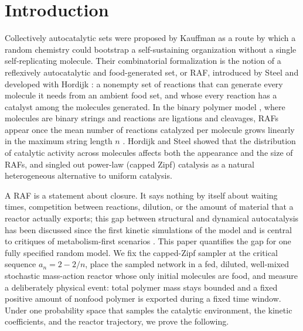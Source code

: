 \documentclass[11pt,letterpaper]{article}
\theoremstyle{plain}
\theoremstyle{definition}
\theoremstyle{remark}
\numberwithin{equation}{section}
\begin{document}
\section{Introduction}\label{sec:intro}

Collectively autocatalytic sets were proposed by Kauffman \cite{kauffman1986autocatalytic} as a route by which a random chemistry could bootstrap a self-sustaining organization without a single self-replicating molecule. Their combinatorial formalization is the notion of a reflexively autocatalytic and food-generated set, or RAF, introduced by Steel \cite{steel2000emergence} and developed with Hordijk \cite{hordijk2004detecting,steel2019autocatalytic}: a nonempty set of reactions that can generate every molecule it needs from an ambient food set, and whose every reaction has a catalyst among the molecules generated. In the binary polymer model \cite{kauffman1986autocatalytic,steel2000emergence,hordijk2004detecting}, where molecules are binary strings and reactions are ligations and cleavages, RAFs appear once the mean number of reactions catalyzed per molecule grows linearly in the maximum string length $n$ \cite{mossel2005random,hordijk2011required}. Hordijk and Steel \cite{hordijk2016variable} showed that the distribution of catalytic activity across molecules affects both the appearance and the size of RAFs, and singled out power-law (capped Zipf) catalysis as a natural heterogeneous alternative to uniform catalysis.

A RAF is a statement about closure. It says nothing by itself about waiting times, competition between reactions, dilution, or the amount of material that a reactor actually exports; this gap between structural and dynamical autocatalysis has been discussed since the first kinetic simulations of the model \cite{farmer1986autocatalytic} and is central to critiques of metabolism-first scenarios \cite{vasas2010lack,hordijk2014evolvability}. This paper quantifies the gap for one fully specified random model. We fix the capped-Zipf sampler at the critical sequence $a_n=2-2/n$, place the sampled network in a fed, diluted, well-mixed stochastic mass-action reactor whose only initial molecules are food, and measure a deliberately physical event: total polymer mass stays bounded and a fixed positive amount of nonfood polymer is exported during a fixed time window. Under one probability space that samples the catalytic environment, the kinetic coefficients, and the reactor trajectory, we prove the following.
\end{document}
